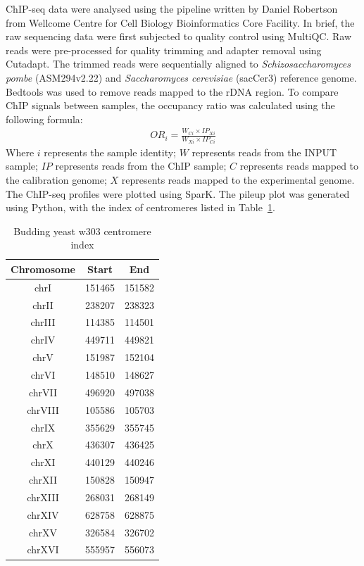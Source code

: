 ChIP-seq data were analysed using the pipeline written by Daniel Robertson from Wellcome Centre for Cell Biology Bioinformatics Core Facility. In brief, the raw sequencing data were first subjected to quality control using MultiQC. Raw reads were pre-processed for quality trimming and adapter removal using Cutadapt. The trimmed reads were sequentially aligned to \textit{Schizosaccharomyces pombe} (ASM294v2.22) and \textit{Saccharomyces cerevisiae} (sacCer3) reference genome. Bedtools was used to remove reads mapped to the rDNA region. To compare ChIP signals between samples, the occupancy ratio was calculated using the following formula:
\begin{align*}
    OR_{i} = \frac{W_{Ci} \times IP_{Xi}}{W_{Xi} \times IP_{Ci}}
\end{align*}
Where $i$ represents the sample identity; $W$ represents reads from the INPUT sample; $IP$ represents reads from the ChIP sample; $C$ represents reads mapped to the calibration genome; $X$ represents reads mapped to the experimental genome. The ChIP-seq profiles were plotted using SparK. The pileup plot was generated using Python, with the index of centromeres listed in Table~\ref{tab:cenIndex}. 

\begin{table}[htbp]
\centering
\caption{Budding yeast w303 centromere index}
\label{tab:cenIndex}
\begin{tabular}{cll}
\hline
\multicolumn{1}{c}{\textbf{Chromosome}} & \multicolumn{1}{c}{\textbf{Start}} & \multicolumn{1}{c}{\textbf{End}} \\ \hline
chrI                & 151465         & 151582       \\
chrII               & 238207         & 238323       \\
chrIII              & 114385         & 114501       \\
chrIV               & 449711         & 449821       \\
chrV                & 151987         & 152104       \\
chrVI               & 148510         & 148627       \\
chrVII              & 496920         & 497038       \\
chrVIII             & 105586         & 105703       \\
chrIX               & 355629         & 355745       \\
chrX                & 436307         & 436425       \\
chrXI               & 440129         & 440246       \\
chrXII              & 150828         & 150947       \\
chrXIII             & 268031         & 268149       \\
chrXIV              & 628758         & 628875       \\
chrXV               & 326584         & 326702       \\
chrXVI              & 555957         & 556073  
\end{tabular}
\end{table}

